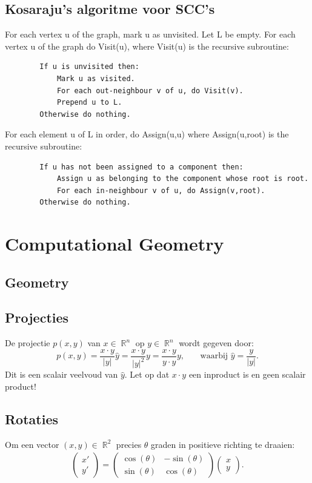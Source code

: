\documentclass[10pt,a4paper,titlepage]{article}
\DeclareMathOperator{\R}{\mathbb{R}}
\begin{document}
\subsection{Kosaraju's algoritme voor SCC's}
For each vertex u of the graph, mark u as unvisited. Let L be empty. For each vertex u of the graph do Visit(u), where Visit(u) is the recursive subroutine:
\begin{verbatim}
        If u is unvisited then:
            Mark u as visited.
            For each out-neighbour v of u, do Visit(v).
            Prepend u to L.
        Otherwise do nothing.
\end{verbatim}
For each element u of L in order, do Assign(u,u) where Assign(u,root) is the recursive subroutine:
\begin{verbatim}
        If u has not been assigned to a component then:
            Assign u as belonging to the component whose root is root.
            For each in-neighbour v of u, do Assign(v,root).
        Otherwise do nothing.
\end{verbatim}
\fi


\section{Computational Geometry}

\subsection{Geometry}
%

\iffalse
\subsection{Projecties}

De projectie $p(x,y)$ van $x\in\R^n$ op $y\in\R^n$ wordt gegeven door:
\[ \text{$p(x,y) = \frac{x\cdot y}{|y|}\hat{y} = \frac{x\cdot y}{|y|^2}y = \frac{x\cdot y}{y\cdot y}y$, ~~~~ waarbij $\hat{y} = \frac{y}{|y|}$.}\]
Dit is een scalair veelvoud van $\hat{y}$. Let op dat $x\cdot y$ een inproduct is en geen scalair product!

\subsection{Rotaties}
Om een vector $(x,y)\in\R^2$ precies $\theta$ graden in positieve richting te draaien:
\begin{align*}
	\begin{pmatrix}
		x' \\
		y'
	\end{pmatrix} = \begin{pmatrix}
		\cos(\theta) & -\sin(\theta) \\
		\sin(\theta) & \cos(\theta)
	\end{pmatrix}\begin{pmatrix}
		x \\
		y
	\end{pmatrix}.
\end{align*}
\end{document}
